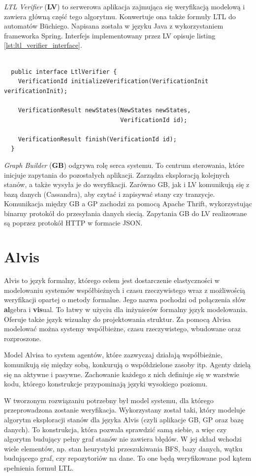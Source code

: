 \textit{LTL Verifier} (\textbf{LV}) to serwerowa aplikacja zajmująca się weryfikacją modelową i zawiera główną część tego algorytmu.
Konwertuje ona także formuły LTL do automatów Büchiego.
Napisana została w języku Java z wykorzystaniem frameworka Spring.
Interfejs implementowany przez LV opisuje listing \ref{lst:ltl_verifier_interface}.

\begin{lstlisting}[caption={Interfejs implementowany przez LV.},captionpos=b,label={lst:ltl_verifier_interface}]

  public interface LtlVerifier {
    VerificationId initializeVerification(VerificationInit verificationInit);

    VerificationResult newStates(NewStates newStates,
                                 VerificationId id);

    VerificationResult finish(VerificationId id);
  }
\end{lstlisting}

\textit{Graph Builder} (\textbf{GB}) odgrywa rolę serca systemu.
To centrum sterowania, które inicjuje zapytania do pozostałych aplikacji.
Zarządza eksploracją kolejnych stanów, a także wysyła je do weryfikacji.
Zarówno GB, jak i LV komunikują się z bazą danych (Cassandra), aby czytać i zapisywać stany czy tranzycje.
Komunikacja między GB a GP zachodzi za pomocą Apache Thrift, wykorzystując binarny protokół do  przesyłania danych siecią.
Zapytania GB do LV realizowane są poprzez protokół HTTP w formacie JSON.


\section{Alvis}

Alvis to język formalny, którego celem jest dostarczenie elastyczności w modelowaniu systemów współbieżnych i czasu rzeczywistego wraz z możliwością weryfikacji opartej o metody formalne.
Jego nazwa pochodzi od połączenia słów \textbf{al}gebra i \textbf{vis}ual.
To łatwy w użyciu dla inżynierów formalny język modelowania.
Oferuje także język wizualny do projektowania struktur.
Za pomocą Alvisa modelować można systemy współbieżne, czasu rzeczywistego, wbudowane oraz rozproszone.

Model Alvisa to system agentów, które zazwyczaj działają współbieżnie, komunikują się między sobą, konkurują o współdzielone zasoby itp.
Agenty dzielą się na aktywne i pasywne.
Zachowanie każdego z nich definiuje się w warstwie kodu, którego konstrukcje przypominają języki wysokiego poziomu.

W tworzonym rozwiązaniu potrzebny był model systemu, dla którego przeprowadzona zostanie weryfikacja.
Wykorzystany został taki, który modeluje algorytm eksploracji stanów dla języka Alvis (czyli aplikacje GB, GP oraz bazę danych).
To konstrukcja, która pozwala sprawdzić samą siebie, a więc czy algorytm budujący pełny graf stanów nie zawiera błędów.
W jej skład wchodzi wiele elementów, np. stan heurystyki przeszukiwania BFS, bazy danych, wątku budującego graf, czy repozytoriów na dane.
To one będą weryfikowane pod kątem spełnienia formuł LTL.
